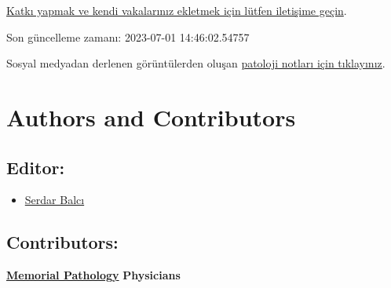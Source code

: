 \documentclass[
  letterpaper,
  paper=6in:9in,
  pagesize=pdftex,
  headinclude=on,
  footinclude=on,
  12pt]{scrbook}
\providecommand{\tightlist}{%
  \setlength{\itemsep}{0pt}\setlength{\parskip}{0pt}}\usepackage{longtable,booktabs,array}
\begin{document}
\href{https://www.patolojiatlasi.com/katki.html}{Katkı yapmak ve kendi
vakalarınız ekletmek için lütfen iletişime geçin}.

Son güncelleme zamanı: 2023-07-01 14:46:02.54757

Sosyal medyadan derlenen görüntülerden oluşan
\href{https://www.patolojinotlari.com/}{patoloji notları için
tıklayınız}.


\hypertarget{sec-authors-contributors}{%
\chapter*{Authors and Contributors}\label{sec-authors-contributors}}


\hypertarget{sec-editor}{%
\section*{Editor:}\label{sec-editor}}


\begin{itemize}
\tightlist
\item
  \href{https://www.serdarbalci.com}{Serdar Balcı}
\end{itemize}

\hypertarget{sec-contributors}{%
\section*{Contributors:}\label{sec-contributors}}


\href{https://patoloji.memorial.com.tr/}{\textbf{Memorial Pathology}}
\textbf{Physicians}
\end{document}
